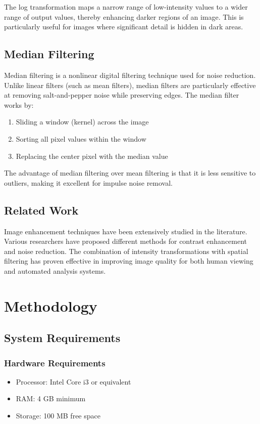 \documentclass[12pt,a4paper]{article}
\begin{document}
The log transformation maps a narrow range of low-intensity values to a wider range of output values, thereby enhancing darker regions of an image. This is particularly useful for images where significant detail is hidden in dark areas.

\subsection{Median Filtering}
Median filtering is a nonlinear digital filtering technique used for noise reduction. Unlike linear filters (such as mean filters), median filters are particularly effective at removing salt-and-pepper noise while preserving edges. The median filter works by:
\begin{enumerate}
    \item Sliding a window (kernel) across the image
    \item Sorting all pixel values within the window
    \item Replacing the center pixel with the median value
\end{enumerate}

The advantage of median filtering over mean filtering is that it is less sensitive to outliers, making it excellent for impulse noise removal.

\subsection{Related Work}
Image enhancement techniques have been extensively studied in the literature. Various researchers have proposed different methods for contrast enhancement and noise reduction. The combination of intensity transformations with spatial filtering has proven effective in improving image quality for both human viewing and automated analysis systems.

\section{Methodology}

\subsection{System Requirements}
\subsubsection{Hardware Requirements}
\begin{itemize}
    \item Processor: Intel Core i3 or equivalent
    \item RAM: 4 GB minimum
    \item Storage: 100 MB free space
\end{itemize}
\end{document}
